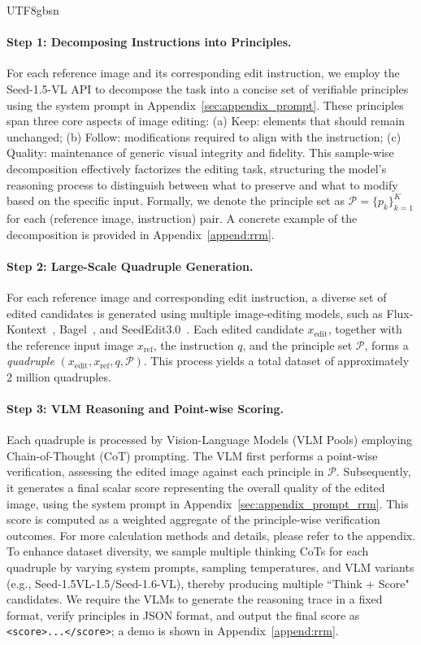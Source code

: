 \documentclass{llmxive}
\begin{document}
\begin{CJK*}{UTF8}{gbsn}
\paragraph{Step 1: Decomposing Instructions into Principles.}
For each reference image and its corresponding edit instruction, we employ the Seed-1.5-VL API to decompose the task into a concise set of verifiable principles using the system prompt in Appendix~\ref{sec:appendix_prompt}. These principles span three core aspects of image editing:
(a) Keep: elements that should remain unchanged;
(b) Follow: modifications required to align with the instruction;
(c) Quality: maintenance of generic visual integrity and fidelity.
This sample-wise decomposition effectively factorizes the editing task, structuring the model's reasoning process to distinguish between what to preserve and what to modify based on the specific input.
Formally, we denote the principle set as $\mathcal{P}=\{p_k\}_{k=1}^{K}$ for each (reference image, instruction) pair.
A concrete example of the decomposition is provided in Appendix~\ref{append:rrm}.
\vspace{-1.0em}
\paragraph{Step 2: Large-Scale Quadruple Generation.}
For each reference image and corresponding edit instruction, a diverse set of edited candidates is generated using multiple image-editing models, such as Flux-Kontext~\citep{blackforestlabs_flux}, Bagel~\citep{deng2025emerging}, and SeedEdit3.0~\citep{wang2025seededit}. Each edited candidate $x_{\mathrm{edit}}$, together with the reference input image $x_{\mathrm{ref}}$, the instruction $q$, and the principle set $\mathcal{P}$, forms a \emph{quadruple} $(x_{\mathrm{edit}}, x_{\mathrm{ref}}, q, \mathcal{P})$. This process yields a total dataset of approximately 2 million quadruples.

\vspace{-1.0em}
\paragraph{Step 3: VLM Reasoning and Point-wise Scoring.}
Each quadruple is processed by Vision-Language Models (VLM Pools) employing Chain-of-Thought (CoT) prompting. The VLM first performs a point-wise verification, assessing the edited image against each principle in $\mathcal{P}$. Subsequently, it generates a final scalar score representing the overall quality of the edited image, using the system prompt in Appendix~\ref{sec:appendix_prompt_rrm}. This score is computed as a weighted aggregate of the principle-wise verification outcomes. For more calculation methods and details, please refer to the appendix.
To enhance dataset diversity, we sample multiple thinking CoTs for each quadruple by varying system prompts, sampling temperatures, and VLM variants (e.g., Seed-1.5VL-1.5/Seed-1.6-VL), thereby producing multiple ``Think + Score" candidates.
We require the VLMs to generate the reasoning trace in a fixed format, verify principles in JSON format, and output the final score as \texttt{<score>...</score>}; a demo is shown in Appendix~\ref{append:rrm}.


\end{CJK*}
\end{document}
